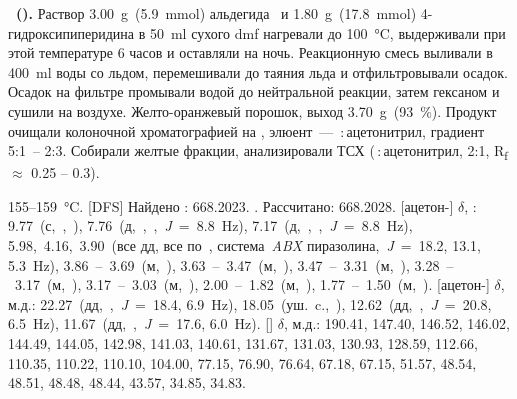 \textbf{~().} 
Раствор \SI{3.00}{\gram}~(\SI{5.9}{\mmol}) альдегида~ и \SI{1.80}{\gram}~(\SI{17.8}{\mmol}) 4-гидроксипиперидина в \SI{50}{\milli\litre} сухого \ac{dmf} нагревали до \SI{100}{\celsius}, выдерживали при этой температуре 6 часов и оставляли на ночь. 
Реакционную смесь выливали в \SI{400}{\milli\litre} воды со льдом, перемешивали до таяния льда и отфильтровывали осадок. 
Осадок на фильтре промывали водой до нейтральной реакции, затем гексаном и сушили на воздухе. 
Желто-оранжевый порошок, выход \SI{3.70}{\gram}~(\SI{93}{\percent}). 
Продукт очищали колоночной хроматографией на , элюент~--- \,:\,ацетонитрил, градиент 5:1~-- 2:3. Собирали желтые фракции, анализировали ТСХ (\,:\,ацетонитрил, 2:1, R\textsubscript{f} $\approx$ 0.25 -- 0.3).
\begin{experimental}[format=\bfseries]
     155--\SI{159}{\celsius}.
    [DFS] Найдено \ce{[M+]}: \num{668.2023}. . Рассчитано:  \num{668.2028}.
    [ацетон-] $\delta$, \si{\ppm}: 9.77~(с,~,~), 7.76~(д,~,~,~\textit{J}~=~8.8~\si{\hertz}), 7.17~(д,~,~,~\textit{J}~=~8.8~\si{\hertz}), 5.98,~4.16,~3.90~(все дд, все по~, система~\emph{ABX} пиразолина,~\textit{J}~=~18.2, 13.1, 5.3~\si{\hertz}), 3.86~--~3.69~(м,~), 3.63~--~3.47~(м,~), 3.47~--~3.31~(м,~), 3.28~--~3.17~(м,~), 3.17~--~3.03~(м,~), 2.00~--~1.82~(м,~), 1.77~--~1.50~(м,~).
    [ацетон-] $\delta$, м.д.: 22.27~(дд,~,~\textit{J}~=~18.4, 6.9~\si{\hertz}), 18.05~(уш.~c.,~), 12.62~(дд,~,~\textit{J}~=~20.8, 6.5~\si{\hertz}), 11.67~(дд,~,~\textit{J}~=~17.6, 6.0~\si{\hertz}).
    [] $\delta$, м.д.: 190.41, 147.40, 146.52, 146.02, 144.49, 144.05, 142.98, 141.03, 140.61, 131.67, 131.03, 130.93, 128.59, 112.66, 110.35, 110.22, 110.10, 104.00, 77.15, 76.90, 76.64, 67.18, 67.15, 51.57, 48.54, 48.51, 48.48, 48.44, 43.57, 34.85, 34.83.
\end{experimental}


